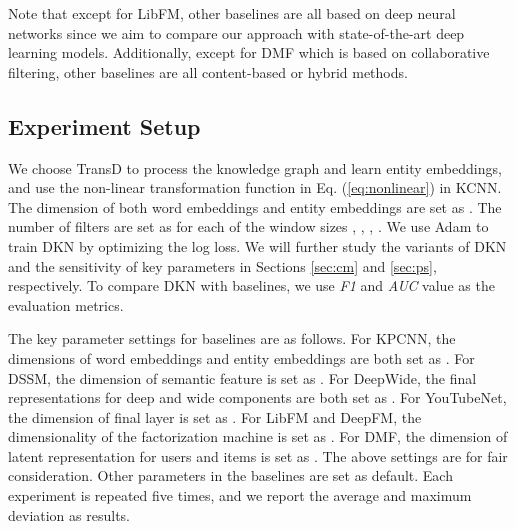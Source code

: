 \documentclass[sigconf]{acmart}
\begin{document}
		Note that except for LibFM, other baselines are all based on deep neural networks since we aim to compare our approach with state-of-the-art deep learning models.
		Additionally, except for DMF which is based on collaborative filtering, other baselines are all content-based or hybrid methods.
		
	
	\subsection{Experiment Setup}
	\label{sec:es}
		We choose TransD \cite{ji2015knowledge} to process the knowledge graph and learn entity embeddings, and use the non-linear transformation function in Eq. (\ref{eq:nonlinear}) in KCNN.
		The dimension of both word embeddings and entity embeddings are set as .
		The number of filters are set as  for each of the window sizes , , , .		
		We use Adam \cite{kingma2014adam} to train DKN by optimizing the log loss.
		We will further study the variants of DKN and the sensitivity of key parameters in Sections \ref{sec:cm} and \ref{sec:ps}, respectively.
		To compare DKN with baselines, we use \textit{F1} and \textit{AUC} value as the evaluation metrics.
		
		The key parameter settings for baselines are as follows.
		For KPCNN, the dimensions of word embeddings and entity embeddings are both set as .
		For DSSM, the dimension of semantic feature is set as .
		For DeepWide, the final representations for deep and wide components are both set as .
		For YouTubeNet, the dimension of final layer is set as .
		For LibFM and DeepFM, the dimensionality of the factorization machine is set as .
		For DMF, the dimension of latent representation for users and items is set as .
		The above settings are for fair consideration.
		Other parameters in the baselines are set as default.
		Each experiment is repeated five times, and we report the average and maximum deviation as results.
	
\end{document}
